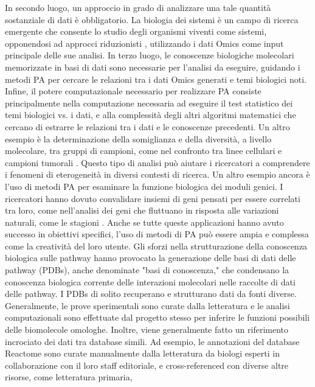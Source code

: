 In secondo luogo, un approccio in grado di analizzare una tale quantità sostanziale di dati è obbligatorio. 
La biologia dei sistemi è un campo di ricerca emergente che consente lo studio degli organismi viventi come sistemi,
opponendosi ad approcci riduzionisti \cite{hartwell1999murray, kitano2002computational}, utilizzando i dati Omics 
come input principale delle sue analisi. In terzo luogo, le conoscenze biologiche molecolari memorizzate in basi 
di dati sono necessarie per l'analisi da eseguire, guidando i metodi PA per cercare le relazioni tra i dati 
Omics generati e temi biologici noti. Infine, il potere computazionale necessario per realizzare PA consiste
principalmente nella computazione necessaria ad eseguire il test statistico dei temi biologici vs. i dati, e 
alla complessità degli altri algoritmi matematici che cercano di estrarre le relazioni tra i dati e le conoscenze
precedenti. 
Un altro esempio è la determinazione della somiglianza e della diversità, a livello molecolare, tra gruppi di campioni,
come nel confronto tra linee cellulari e campioni tumorali \cite{heiser2012subtype}. Questo tipo di analisi può 
aiutare i ricercatori a comprendere i fenomeni di eterogeneità in diversi contesti di ricerca. Un altro esempio 
ancora è l'uso di metodi PA per esaminare la funzione biologica dei moduli genici. I ricercatori hanno
dovuto convalidare insiemi di geni pensati per essere correlati tra loro, come nell'analisi dei geni che fluttuano 
in risposta alle variazioni naturali, come le stagioni \cite{dopico2015widespread}. Anche se tutte queste 
applicazioni hanno avuto successo in obiettivi specifici, l'uso di metodi di PA può essere ampia e complessa come 
la creatività del loro utente. Gli sforzi nella strutturazione della conoscenza biologica sulle pathway hanno provocato 
la generazione delle basi di dati delle pathway (PDBs), anche denominate "basi di conoscenza," che condensano la
conoscenza biologica corrente delle interazioni molecolari nelle raccolte di dati delle pathway. I PDBs di 
solito recuperano e strutturano dati da fonti diverse. Generalmente, le prove sperimentali sono curate dalla 
letteratura e le analisi computazionali sono effettuate dal progetto stesso per inferire le funzioni possibili delle
biomolecole omologhe.
Inoltre, viene generalmente fatto un riferimento incrociato dei dati tra database simili. Ad esempio, le annotazioni 
del database Reactome \cite{vastrik2007reactome} sono curate manualmente dalla letteratura da biologi esperti in
collaborazione con il loro staff editoriale, e cross-referenced con diverse altre risorse, come letteratura primaria,
